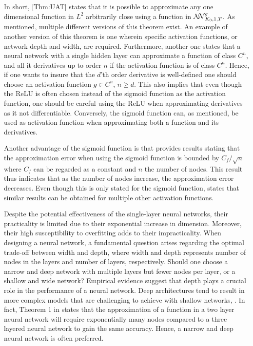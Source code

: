 In short, \autoref{Thm:UAT} states that it is possible to approximate any one dimensional function in $L^2$ arbitrarily close using a function in $\mathcal{N\mkern-5mu N}^g_{K_0, 1, T}$. As mentioned, multiple different versions of this theorem exist. An example of another version of this theorem is one wherein specific activation functions, or network depth and width, are required. Furthermore, another one states that a neural network with a single hidden layer can approximate a function of class $C^n$, and all it derivatives up to order $n$ if the activation function is of class $C^n$. Hence, if one wants to insure that the $d$'th order derivative is well-defined one should choose an activation function $g \in C^n$, $n \geq d$. This also implies that even though the ReLU is often chosen instead of the sigmoid function as the activation function, one should be careful using the ReLU when approximating derivatives as it not differentiable. Conversely, the sigmoid function can, as mentioned, be used as activation function when approximating both a function and its derivatives.

Another advantage of the sigmoid function is that \citep{Barron} provides results stating that the approximation error when using the sigmoid function is bounded by $C_f/\sqrt{n}$ where $C_f$ can be regarded as a constant and $n$ the number of nodes. This result thus indicates that as the number of nodes increase, the approximation error decreases. Even though this is only stated for the sigmoid function, \citep[s. 117]{Barron} states that similar results can be obtained for multiple other activation functions.

Despite the potential effectiveness of the single-layer neural networks, their practicality is limited due to their exponential increase in dimension. Moreover, their high susceptibility to overfitting adds to their impracticality. When designing a neural network, a fundamental question arises regarding the optimal trade-off between width and depth, where width and depth represents number of nodes in the layers and number of layers, respectively. Should one choose a narrow and deep network with multiple layers but fewer nodes per layer, or a shallow and wide network? Empirical evidence suggest that depth plays a crucial role in the performance of a neural network. Deep architectures tend to result in more complex models that are challenging to achieve with shallow networks, \citep{REOS}. In fact, Theorem 1 in \citep{REOS} states that the approximation of a function in a two layer neural network will require exponentially many nodes compared to a three layered neural network to gain the same accuracy. Hence, a narrow and deep neural network is often preferred.